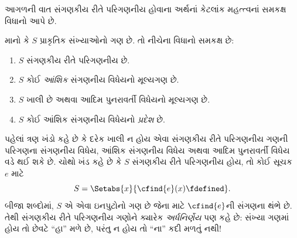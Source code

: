 \documentclass[../../../include/open-logic-section]{subfiles}
\begin{document}



આગળની વાત સંગણકીય રીતે પરિગણનીય હોવાના અર્થનાં કેટલાંક
મહત્ત્વનાં સમકક્ષ વિધાનો આપે છે.

\begin{thm}
માનો કે $S$ પ્રાકૃતિક સંખ્યાઓનો ગણ છે. તો નીચેના વિધાનો
સમકક્ષ છે:
\begin{enumerate}
\item{} $S$ સંગણકીય રીતે પરિગણનીય છે.
\item{} $S$ કોઈ \emph{આંશિક} સંગણનીય વિધેયનો મૂલ્યગણ છે.
\item{} $S$ ખાલી છે અથવા આદિમ પુનરાવર્તી વિધેયનો મૂલ્યગણ છે.
\item{} $S$ કોઈ આંશિક સંગણનીય વિધેયનો \emph{પ્રદેશ} છે.
\end{enumerate}
\end{thm}

\begin{explain}
પહેલાં ત્રણ ખંડો કહે છે કે દરેક ખાલી ન હોય એવા સંગણકીય રીતે
પરિગણનીય ગણની પરિગણના સંગણનીય વિધેય, આંશિક સંગણનીય વિધેય
અથવા આદિમ પુનરાવર્તી વિધેય વડે થઈ શકે છે. ચોથો ખંડ કહે છે કે
$S$ સંગણકીય રીતે પરિગણનીય હોય, તો કોઈ સૂચક~$e$ માટે
\[
S = \Setabs{x}{\cfind{e}(x) \fdefined}.
\]
બીજા શબ્દોમાં, $S$ એ એવા ઇનપુટોનો ગણ છે જેના માટે
$\cfind{e}$ની સંગણના થંભે છે. તેથી સંગણકીય રીતે પરિગણનીય
ગણોને ક્યારેક \emph{અર્ધનિર્ણેય} પણ કહે છે: સંખ્યા ગણમાં હોય
તો છેવટે ``હા'' મળે છે, પરંતુ ન હોય તો ``ના'' કદી મળતું નથી!{}
\end{explain}
\end{document}
